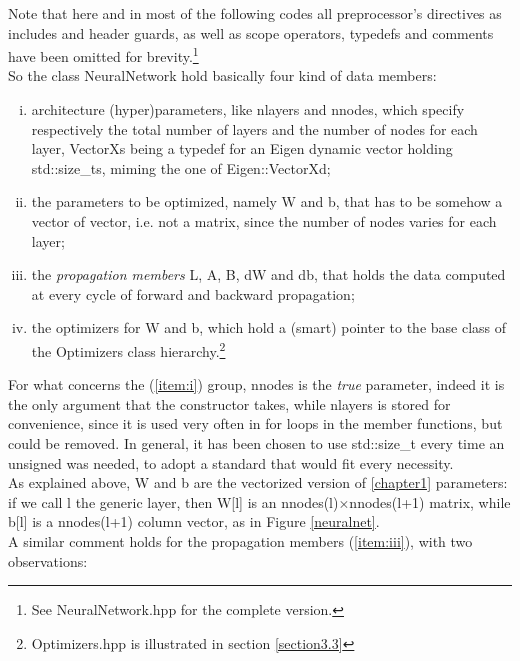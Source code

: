 \documentclass[12pt, a4paper]{report}
\theoremstyle{definition}
\begin{document}
{\begin{lstlisting}[frame=single, name=neuralnet, showstringspaces=false]
\end{lstlisting}
\noindent Note that here and in most of the following codes all preprocessor's directives as includes and header guards, as well as scope operators, typedefs and comments have been omitted for brevity.\footnote{See NeuralNetwork.hpp for the complete version.}\\
So the class NeuralNetwork hold basically four kind of data members: 
\begin{enumerate}[(i)]
	\item\label{item:i} architecture (hyper)parameters, like {\ttfamily nlayers} and {\ttfamily nnodes}, which specify respectively the total number of layers and the number of nodes for each layer, {\ttfamily VectorXs} being a {\ttfamily typedef} for an Eigen dynamic vector holding {\ttfamily std::size\_t}s, miming the one of {\ttfamily Eigen::VectorXd};
	\item\label{item:ii} the parameters to be optimized, namely {\ttfamily W} and {\ttfamily b}, that has to be somehow a vector of vector, i.e. not a matrix, since the number of nodes varies for each layer;
	\item\label{item:iii} the \textit{propagation members} {\ttfamily L}, {\ttfamily A}, {\ttfamily B}, {\ttfamily dW} and {\ttfamily db}, that holds the data computed at every cycle of forward and backward propagation;
	\item \label{item:iv} the optimizers for {\ttfamily W} and {\ttfamily b}, which hold a (smart) pointer to the base class of the Optimizers class hierarchy.\footnote{Optimizers.hpp is illustrated in section \ref{section3.3}}
\end{enumerate}
For what concerns the (\ref{item:i}) group, {\ttfamily nnodes} is the \textit{true} parameter, indeed it is the only argument that the constructor takes, while {\ttfamily nlayers} is stored for convenience, since it is used very often in for loops in the member functions, but could be removed. In general, it has been chosen to use {\ttfamily std::size\_t} every time an unsigned was needed, to adopt a standard that would fit every necessity.\\
As explained above, {\ttfamily W} and {\ttfamily b} are the vectorized version of \ref{chapter1} parameters: if we call {\ttfamily l} the generic layer, then {\ttfamily W[l]} is an {\ttfamily nnodes(l)}$\times${\ttfamily nnodes(l+1)} matrix, while {\ttfamily b[l]} is a {\ttfamily nnodes(l+1)} column vector, as in Figure \ref{neuralnet}.\\
A similar comment holds for the propagation members (\ref{item:iii}), with two observations:
}
\end{document}
